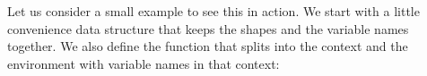 {Let us consider a small example to see this in action.  We start with a little
convenience data structure  that keeps the shapes and the variable names
together.  We also define the function  that splits 
 into the context and the environment with variable names in that context:
\begin{code}%
%
\>[2]\AgdaSpace{}%
\AgdaSpace{}%
\AgdaSymbol{:}\AgdaSpace{}%
\AgdaSpace{}%
\<%
\\
\>[2][@{}l@{\AgdaIndent{0}}]%
\>[4]\AgdaSpace{}%
\AgdaSymbol{:}\AgdaSpace{}%
\<%
\\
%
\>[4]\AgdaSpace{}%
\AgdaSymbol{:}\AgdaSpace{}%
\AgdaSpace{}%
\AgdaSpace{}%
\AgdaSpace{}%
\AgdaSpace{}%
\AgdaSpace{}%
\AgdaSpace{}%
\<%
\\
%
\\[\AgdaEmptyExtraSkip]%
%
\>[2]\AgdaSpace{}%
\AgdaSymbol{:}\AgdaSpace{}%
\AgdaSpace{}%
\AgdaSpace{}%
\AgdaSpace{}%
\AgdaSpace{}%
\<%
\end{code}
\begin{code}[hide]%
%
\>[2]\AgdaSpace{}%
\AgdaSpace{}%
\AgdaSymbol{=}\AgdaSpace{}%
\AgdaSpace{}%
\AgdaOperator{\AgdaInductiveConstructor{,}}\AgdaSpace{}%
\<%
\\
%
\>[2]\AgdaSpace{}%
\AgdaSymbol{(}\AgdaSpace{}%
\AgdaSpace{}%
\AgdaSymbol{(}\AgdaSpace{}%
\AgdaOperator{\AgdaInductiveConstructor{,}}\AgdaSpace{}%
\AgdaSymbol{))}\AgdaSpace{}%
\AgdaSymbol{=}\AgdaSpace{}%
\AgdaSpace{}%
\AgdaSpace{}%
\AgdaOperator{\AgdaInductiveConstructor{,}}\AgdaSpace{}%
\AgdaSpace{}%
\AgdaSymbol{=}\AgdaSpace{}%
\AgdaSpace{}%
\AgdaSpace{}%
\AgdaSpace{}%
\AgdaSymbol{(}\AgdaSpace{}%
\AgdaSpace{}%
\AgdaSpace{}%
\AgdaSymbol{)}\AgdaSpace{}%

\end{code}}
